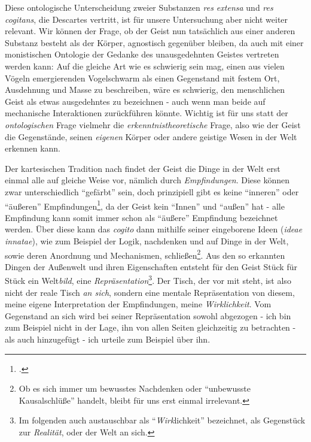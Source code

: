 \documentclass[a4paper, 12pt]{article}
\begin{document}
\begin{onehalfspace}
Diese ontologische Unterscheidung zweier Substanzen \emph{res extensa} und \emph{res cogitans}, die Descartes vertritt, ist für unsere Untersuchung aber nicht weiter relevant. Wir können der Frage, ob der Geist nun tatsächlich aus einer anderen Substanz besteht als der Körper, agnostisch gegenüber bleiben, da auch mit einer monistischen Ontologie der Gedanke des unausgedehnten Geistes vertreten werden kann: Auf die gleiche Art wie es schwierig sein mag, einen aus vielen Vögeln emergierenden Vogelschwarm als einen Gegenstand mit festem Ort, Ausdehnung und Masse zu beschreiben, wäre es schwierig, den menschlichen Geist als etwas ausgedehntes zu bezeichnen - auch wenn man beide auf mechanische Interaktionen zurückführen könnte. Wichtig ist für uns statt der \emph{ontologischen} Frage vielmehr die \emph{erkenntnistheoretische} Frage, also wie der Geist die Gegenstände, seinen \emph{eigenen} Körper oder andere geistige Wesen in der Welt erkennen kann.


Der kartesischen Tradition nach findet der Geist die Dinge in der Welt erst einmal alle auf gleiche Weise vor, nämlich durch \emph{Empfindungen}. Diese können zwar unterschiedlich "`gefärbt"' sein, doch prinzipiell gibt es keine "`inneren"' oder "`äußeren"' Empfindungen\footnote{\Cite[Vgl.][S. ?? (501?)]{scheler-ethik}.}, da der Geist kein "`Innen"' und "`außen"' hat - alle Empfindung kann somit immer schon als "`äußere"' Empfindung bezeichnet werden. Über diese kann das \emph{cogito} dann mithilfe seiner eingeborene Ideen (\emph{ideae innatae}), wie zum Beispiel der Logik, nachdenken und auf Dinge in der Welt, sowie deren Anordnung und Mechanismen, schließen\footnote{Ob es sich immer um bewusstes Nachdenken oder "`unbewusste Kausalschlüße"' handelt, bleibt für uns erst einmal irrelevant.}. Aus den so erkannten Dingen der Außenwelt und ihren Eigenschaften entsteht für den Geist Stück für Stück ein Welt\emph{bild}, eine \emph{Repräsentation}\footnote{Im folgenden auch austauschbar als "`\emph{Wirk}lichkeit"' bezeichnet, als Gegenstück zur \emph{Realität}, oder der Welt an sich.}. Der Tisch, der vor mit steht, ist also nicht der reale Tisch \emph{an sich}, sondern eine mentale Repräsentation von diesem, meine eigene Interpretation der Empfindungen, meine \emph{Wirklichkeit}. Vom Gegenstand an sich wird bei seiner Repräsentation sowohl abgezogen - ich bin zum Beispiel nicht in der Lage, ihn von allen Seiten gleichzeitig zu betrachten - als auch hinzugefügt - ich urteile zum Beispiel über ihn.


\end{onehalfspace}
\end{document}
